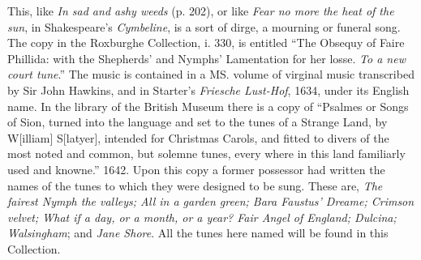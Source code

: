 

This, like \textit{In sad and ashy weeds} (p. 202), or like \textit{Fear no more the heat of the
sun}, in Shakespeare’s \textit{Cymbeline}, is a sort of dirge, a mourning or funeral song.
The copy in the Roxburghe Collection, i. 330, is entitled “The Obsequy of
Faire Phillida: with the Shepherds’ and Nymphs’ Lamentation for her losse.
\textit{To a new court tune}.” The music is contained in a MS. volume of virginal
music transcribed by Sir John Hawkins, and in Starter’s \textit{Friesche Lust-Hof},
1634, under its English name. In the library of the British Museum there is a
copy of “Psalmes or Songs of Sion, turned into the language and set to the tunes
of a Strange Land, by W[illiam] S[latyer], intended for Christmas Carols, and
fitted to divers of the most noted and common, but solemne tunes, every where
in this land familiarly used and knowne.” 1642. Upon this copy a former
possessor had written the names of the tunes to which they were designed to be
sung. These are, \textit{The fairest Nymph the valleys; All in a garden green; Bara
Faustus’ Dreame; Crimson velvet; What if a day, or a month, or a year? Fair
Angel of England; Dulcina; Walsingham}; and \textit{Jane Shore}.\scfootnote
{All the tunes here named will be found in this Collection.}


\medskip


\pagebreak

